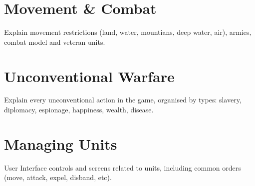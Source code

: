\section{Movement \& Combat}

Explain movement restrictions (land, water, mountians, deep water, air),
armies, combat model and veteran units.

\section{Unconventional Warfare}

Explain every unconventional action in the game, organised by types: slavery,
diplomacy, espionage, happiness, wealth, disease.

\section{Managing Units}

User Interface controls and screens related to units, including common orders
(move, attack, expel, disband, etc).

